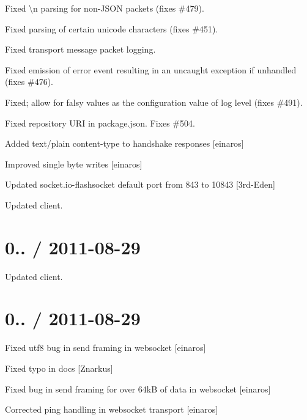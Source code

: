 \begin{DoxyItemize}
\item Fixed {\ttfamily \textbackslash{}n} parsing for non-\/\+J\+S\+ON packets (fixes \#479).
\item Fixed parsing of certain unicode characters (fixes \#451).
\item Fixed transport message packet logging.
\item Fixed emission of {\ttfamily error} event resulting in an uncaught exception if unhandled (fixes \#476).
\item Fixed; allow for falsy values as the configuration value of {\ttfamily log level} (fixes \#491).
\item Fixed repository U\+RI in {\ttfamily package.\+json}. Fixes \#504.
\item Added text/plain content-\/type to handshake responses \mbox{[}einaros\mbox{]}
\item Improved single byte writes \mbox{[}einaros\mbox{]}
\item Updated socket.\+io-\/flashsocket default port from 843 to 10843 \mbox{[}3rd-\/\+Eden\mbox{]}
\item Updated client.
\end{DoxyItemize}

\section*{0.. / 2011-\/08-\/29 }


\begin{DoxyItemize}
\item Updated client.
\end{DoxyItemize}

\section*{0.. / 2011-\/08-\/29 }


\begin{DoxyItemize}
\item Fixed utf8 bug in send framing in websocket \mbox{[}einaros\mbox{]}
\item Fixed typo in docs \mbox{[}Znarkus\mbox{]}
\item Fixed bug in send framing for over 64kB of data in websocket \mbox{[}einaros\mbox{]}
\item Corrected ping handling in websocket transport \mbox{[}einaros\mbox{]}
\end{DoxyItemize}

